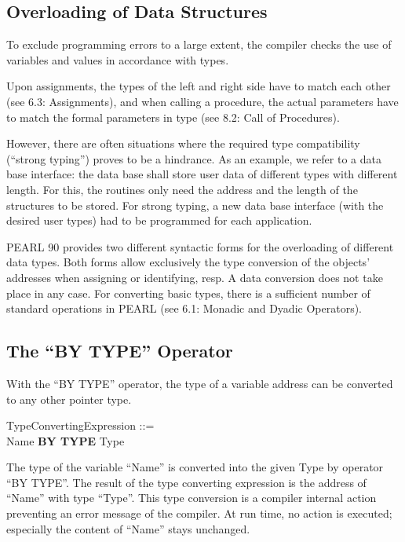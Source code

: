\begin{removed}
\section{Overloading of Data Structures}   %

To exclude programming errors to a large extent, the compiler checks the
use of variables and values in accordance with types.

Upon assignments, the types of the left and right side have to match
each other (see 6.3: Assignments), and when calling a procedure, the
actual parameters have to match the formal parameters in type (see 8.2:
Call of Procedures).

However, there are often situations where the required type
compatibility (``strong typing'') proves to be a hindrance. As an
example, we refer to a data base interface: the data base shall store
user data of different types with different length. For this, the
routines only need the address and the length of the structures to be
stored. For strong typing, a new data base interface (with the desired
user types) had to be programmed for each application.

PEARL 90 provides two different syntactic forms for the overloading of
different data types. Both forms allow exclusively the type conversion
of the objects' addresses when assigning or identifying, resp. A data
conversion does not take place in any case. For converting basic types,
there is a sufficient number of standard operations in PEARL (see 6.1:
Monadic and Dyadic Operators).

\subsection{The ``BY TYPE'' Operator} %

With the ``BY TYPE'' operator, the type of a variable address can be
converted to any other pointer type.

TypeConvertingExpression ::=\\
\x Name {\bf BY TYPE} Type

The type of the variable ``Name'' is converted into the given Type by
operator ``BY TYPE''. The result of the type converting expression is
the address of ``Name'' with type ``Type''. This type conversion is a
compiler internal action preventing an error message of the compiler. At
run time, no action is executed; especially the content of ``Name''
stays unchanged.


\end{removed}
